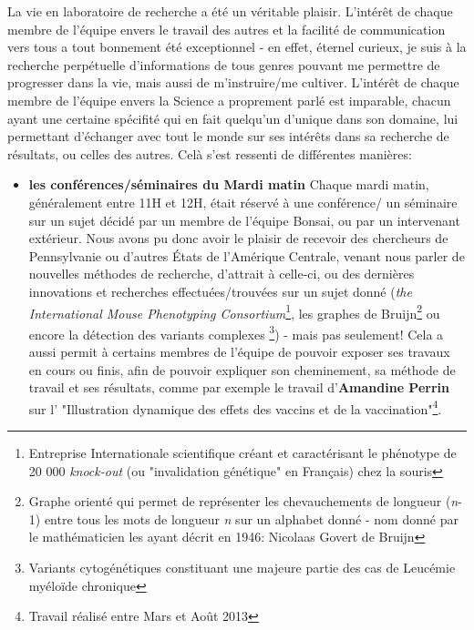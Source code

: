 \documentclass{report}
\begin{document}
La vie en laboratoire de recherche a été un véritable plaisir.
\newline
L'intérêt de chaque membre de l'équipe envers le travail des autres et la facilité de communication vers tous a tout bonnement été exceptionnel - en effet, éternel curieux, je suis à la recherche perpétuelle d'informations de tous genres pouvant me permettre de progresser dans la vie, mais aussi de m'instruire/me cultiver. L'intérêt de chaque membre de l'équipe envers la Science a proprement parlé est imparable, chacun ayant une certaine spécifité qui en fait quelqu'un d'unique dans son domaine, lui permettant d'échanger avec tout le monde sur ses intérêts dans sa recherche de résultats, ou celles des autres.
\newline
Celà s'est ressenti de différentes manières:
\begin{itemize}
\item \textbf{les conférences/séminaires du Mardi matin}
	\newline
	Chaque mardi matin, généralement entre 11H et 12H, était réservé à une conférence/ un séminaire sur un sujet décidé par un membre de l'équipe Bonsai, ou par un intervenant extérieur.
	\newline
	Nous avons pu donc avoir le plaisir de recevoir des chercheurs de Pennsylvanie ou d'autres États de l'Amérique Centrale, venant nous parler de nouvelles méthodes de recherche, d'attrait à celle-ci, ou des dernières innovations et recherches effectuées/trouvées sur un sujet donné (\textit{the International Mouse Phenotyping Consortium}\footnote{Entreprise Internationale scientifique créant et caractérisant le phénotype de 20 000 \textit{knock-out} (ou "invalidation génétique" en Français) chez la souris}, les graphes de Bruijn\footnote{Graphe orienté qui permet de représenter les chevauchements de longueur (\textit{n}-1) entre tous les mots de longueur \textit{n} sur un alphabet donné - nom donné par le mathématicien les ayant décrit en 1946: Nicolaas Govert de Bruijn} ou encore la détection des variants complexes \footnote{Variants cytogénétiques constituant une majeure partie des cas de Leucémie myéloïde chronique}) -  mais pas seulement!
	\newline
	Cela a aussi permit à certains membres de l'équipe de pouvoir exposer ses travaux en cours ou finis, afin de pouvoir expliquer son cheminement, sa méthode de travail et ses résultats, comme par exemple le travail d'\textbf{Amandine Perrin} sur l' "Illustration dynamique des effets des vaccins et de la vaccination"\footnote{Travail réalisé entre Mars et Août 2013}.

\end{itemize}
\end{document}
